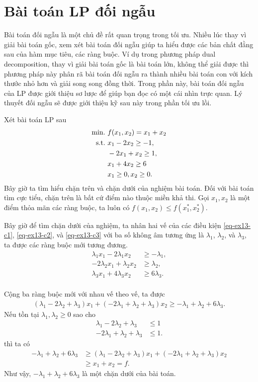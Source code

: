 \documentclass{book}
\begin{document}
\section{Bài toán LP đối ngẫu}
Bài toán đối ngẫu là một chủ đề rất quan trọng trong tối ưu. 
Nhiều lúc thay vì giải bài toán gốc, xem xét bài toán đối ngẫu giúp ta hiểu được các bản chất đằng sau của hàm mục tiêu, các ràng buộc. Ví dụ trong phương pháp dual decomposition, thay vì giải bài toán gốc là bài toán lớn, không thể giải được thì phương pháp này phân rã bài toán đối ngẫu ra thành nhiều bài toán con với kích thước nhỏ hơn và giải song song đồng thời. 
Trong phần này, bài toán đối ngẫu của LP được giới thiệu sơ lược để giúp bạn đọc có một cái nhìn trực quan. 
Lý thuyết đối ngẫu sẽ được giới thiệu kỹ sau này trong phần tối ưu lồi.

Xét bài toán LP sau
\begin{align}
\rm{min.}~ & f(x_1, x_2) = x_1 + x_2 \label{eq-ex13-obj}\\
\rm{s.t.}~ & x_1 - 2x_2 \geq -1,\label{eq-ex13-c1}\\
		& - 2x_1 + x_2 \geq 1,\label{eq-ex13-c2}\\
		&  x_1 + 4x_2 \geq 6 \label{eq-ex13-c3}\\
		&	x_1 \geq 0,	x_2 \geq 0.		
\end{align}
Bây giờ ta tìm hiểu chặn trên và chặn dưới của nghiệm bài toán.
Đối với bài toán tìm cực tiểu, chặn trên là bất cứ điểm nào thuộc miền khả thi.
Gọi $x_1, x_2$ là một điểm thỏa mãn các ràng buộc, ta luôn có $f(x_1, x_2) \leq f(x_1^*, x_2^*)$.

Bây giờ để tìm chặn dưới của nghiệm, ta nhân hai vế của các điều kiện  \eqref{eq-ex13-c1}, \eqref{eq-ex13-c2}, và \eqref{eq-ex13-c3} với ba số không âm tương ứng là $\lambda_1$, $\lambda_2$, và $\lambda_3$, ta được các ràng buộc mới tương đương.
\begin{align*}
 \lambda_1 x_1 - 2\lambda_1 x_2 &\geq -\lambda_1,\\
 - 2\lambda_2 x_1 + \lambda_2 x_2 &\geq \lambda_2,\\
  \lambda_3 x_1 + 4\lambda_3 x_2 &\geq 6\lambda_3.\\
\end{align*}

Cộng ba ràng buộc mới với nhau vế theo vế, ta được 
\begin{align*}
(\lambda_1 -2 \lambda_2 + \lambda_3)x_1 + (- 2 \lambda_1 + \lambda_2 + \lambda_3)x_2 \geq -\lambda_1 +  \lambda_2 + 6\lambda_3.
\end{align*}
Nếu tồn tại $\lambda_1, \lambda_2 \geq 0$ sao cho 
\begin{align*}
\lambda_1 -2 \lambda_2 + \lambda_3 		&\leq 1 \\
- 2 \lambda_1 + \lambda_2 + \lambda_3 	&\leq 1.
\end{align*}
thì ta có 
\begin{align*}
-\lambda_1 +  \lambda_2 + 6\lambda_3 & \geq (\lambda_1 -2 \lambda_2 + \lambda_3)x_1 + (- 2 \lambda_1 + \lambda_2 + \lambda_3)x_2 \\
 									& \geq x_1+	x_2 = f.
\end{align*}
Như vậy, $-\lambda_1 +  \lambda_2 + 6\lambda_3$ là một chặn dưới của bài toán.
\end{document}
